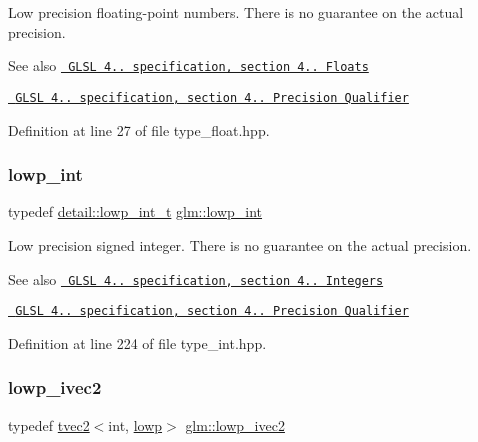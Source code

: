 Low precision floating-\/point numbers. There is no guarantee on the actual precision.

\begin{DoxySeeAlso}{See also}
\href{http://www.opengl.org/registry/doc/GLSLangSpec.4.20.8.pdf}{\texttt{ G\+L\+SL 4.. specification, section 4.. Floats}} 

\href{http://www.opengl.org/registry/doc/GLSLangSpec.4.20.8.pdf}{\texttt{ G\+L\+SL 4.. specification, section 4.. Precision Qualifier}} 
\end{DoxySeeAlso}


Definition at line 27 of file type\+\_\+float.\+hpp.

\mbox{\label{group__core__precision_ga4681244bf4a184734f03aa9df4e3d288}} 
\subsubsection{\texorpdfstring{lowp\_int}{lowp\_int}}
{\footnotesize\ttfamily typedef \mbox{\hyperlink{namespaceglm_1_1detail_a030a8128e369fc1f9c7982dc68a78ba7}{detail\+::lowp\+\_\+int\+\_\+t}} \mbox{\hyperlink{group__core__precision_ga4681244bf4a184734f03aa9df4e3d288}{glm\+::lowp\+\_\+int}}}

Low precision signed integer. There is no guarantee on the actual precision.

\begin{DoxySeeAlso}{See also}
\href{http://www.opengl.org/registry/doc/GLSLangSpec.4.20.8.pdf}{\texttt{ G\+L\+SL 4.. specification, section 4.. Integers}} 

\href{http://www.opengl.org/registry/doc/GLSLangSpec.4.20.8.pdf}{\texttt{ G\+L\+SL 4.. specification, section 4.. Precision Qualifier}} 
\end{DoxySeeAlso}


Definition at line 224 of file type\+\_\+int.\+hpp.

\mbox{\label{group__core__precision_gafae8c6e9da91f4c6c1b85af5b8513097}} 
\subsubsection{\texorpdfstring{lowp\_ivec2}{lowp\_ivec2}}
{\footnotesize\ttfamily typedef \mbox{\hyperlink{structglm_1_1tvec2}{tvec2}}$<$int, \mbox{\hyperlink{namespaceglm_a0f04f086094c747d227af4425893f545ae161af3fc695e696ce3bf69f7332bc2d}{lowp}}$>$ \mbox{\hyperlink{group__core__precision_gafae8c6e9da91f4c6c1b85af5b8513097}{glm\+::lowp\+\_\+ivec2}}}

